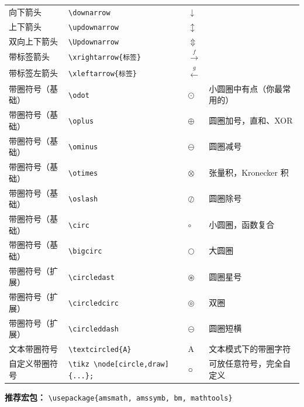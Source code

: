 \begin{longtable}{|l|p{4cm}|l|p{6cm}|}
向下箭头 & \texttt{\textbackslash downarrow} & \(\downarrow\) \\
上下箭头 & \texttt{\textbackslash updownarrow} & \(\updownarrow\) \\
双向上下箭头 & \texttt{\textbackslash Updownarrow} & \(\Updownarrow\) \\
带标签箭头 & \texttt{\textbackslash xrightarrow\{标签\}} & \(\xrightarrow{f}\)  \\
带标签左箭头 & \texttt{\textbackslash xleftarrow\{标签\}} & \(\xleftarrow{g}\)  \\
\hline
带圈符号（基础） & \verb|\odot| & $\odot$ & 小圆圈中有点（你最常用的） \\ 
\hline 带圈符号（基础） & \verb|\oplus| & $\oplus$ & 圆圈加号，直和、XOR \\ 
\hline 带圈符号（基础） & \verb|\ominus| & $\ominus$ & 圆圈减号 \\ 
\hline 带圈符号（基础） & \verb|\otimes| & $\otimes$ & 张量积，Kronecker 积 \\ 
\hline 带圈符号（基础） & \verb|\oslash| & $\oslash$ & 圆圈除号 \\ \hline 带圈符号（基础） & \verb|\circ| & $\circ$ & 小圆圈，函数复合 \\ 
\hline 带圈符号（基础） & \verb|\bigcirc| & $\bigcirc$ & 大圆圈 \\ 
\hline 带圈符号（扩展） & \verb|\circledast| & $\circledast$ & 圆圈星号 \\ 
\hline 带圈符号（扩展） & \verb|\circledcirc| & $\circledcirc$ & 双圈 \\ 
\hline 带圈符号（扩展） & \verb|\circleddash| & $\circleddash$ & 圆圈短横 \\
\hline 文本带圈符号 & \verb|\textcircled{A}| & \textcircled{A} & 文本模式下的带圈字符 \\ 
\hline 自定义带圈符号 & \verb|\tikz \node[circle,draw]{...};| & ○ & 可放任意符号，完全自定义 \\ 
\hline
\end{longtable}

\vspace{1em}
\noindent
\textbf{推荐宏包：} \verb|\usepackage{amsmath, amssymb, bm, mathtools}|

